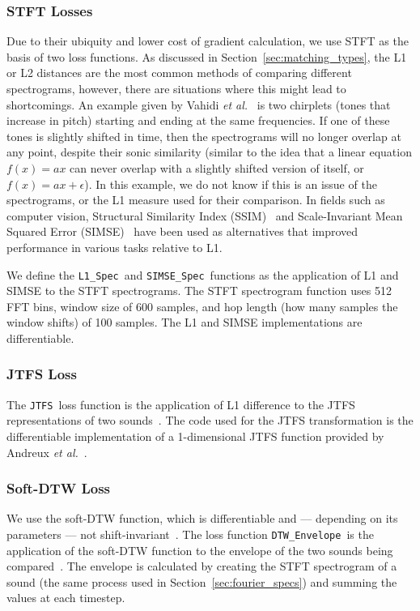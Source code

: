 \documentclass[lettersize,journal]{IEEEtran}
\newcommand{\SIMSESpec}{\texttt{SIMSE\_Spec}}
\newcommand{\LoneSpec}{\texttt{L1\_Spec}}
\newcommand{\JTFS}{\texttt{JTFS}}
\newcommand{\DTWEnv}{\texttt{DTW\_Envelope}}
\begin{document}
\subsubsection{STFT Losses}
Due to their ubiquity and lower cost of gradient calculation, we use STFT as the basis of two loss functions. As discussed in Section~\ref{sec:matching_types}, the L1 or L2 distances are the most common methods of comparing different spectrograms, however, there are situations where this might lead to shortcomings. An example given by Vahidi \textit{et al.}~\cite{vahidi2023mesostructures} is two chirplets (tones that increase in pitch) starting and ending at the same frequencies. If one of these tones is slightly shifted in time, then the spectrograms will no longer overlap at any point, despite their sonic similarity (similar to the idea that a linear equation $f(x) = ax$ can never overlap with a slightly shifted version of itself, or $f(x) = ax +\epsilon$). In this example, we do not know if this is an issue of the spectrograms, or the L1 measure used for their comparison. In fields such as computer vision, Structural Similarity Index (SSIM)~\cite{wang2004imagesssim,wang2009mean} and Scale-Invariant Mean Squared Error (SIMSE)~\cite{barron2014shapessimse} have been used as alternatives that improved performance in various tasks relative to L1.

We define the \LoneSpec~and \SIMSESpec~functions as the application of L1 and SIMSE to the STFT spectrograms. The STFT spectrogram function uses 512 FFT bins, window size of 600 samples, and hop length (how many samples the window shifts) of 100 samples. The L1 and SIMSE implementations are differentiable. 

\subsubsection{JTFS Loss}
The \JTFS~loss function is the application of L1 difference to the JTFS representations of two sounds~\cite{vahidi2023mesostructures}. The code used for the JTFS transformation is the differentiable implementation of a 1-dimensional JTFS function provided by Andreux \textit{et al.}~\cite{kymatio}.

\subsubsection{Soft-DTW Loss}
We use the soft-DTW function, which is differentiable and --- depending on its parameters --- not shift-invariant~\cite{cuturi2017soft,janati2020spatio,tavenard.blog.softdtw}. The loss function \DTWEnv~is the application of the soft-DTW function to the envelope of the two sounds being compared~\cite{lyons1997understanding}. The envelope is calculated by creating the STFT spectrogram of a sound (the same process used in Section~\ref{sec:fourier_specs}) and summing the values at each timestep. 
\end{document}

